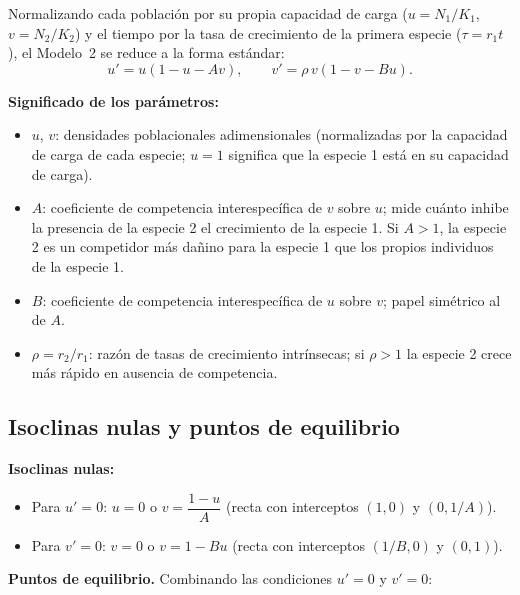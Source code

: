 \documentclass[11pt,letterpaper]{article}
\begin{document}
Normalizando cada población por su propia capacidad de carga ($u=N_1/K_1$,
$v=N_2/K_2$) y el tiempo por la tasa de crecimiento de la primera especie
($\tau=r_1 t$), el Modelo~2 se reduce a la forma estándar:
\[
\boxed{u' = u(1-u-Av),\qquad v' = \rho\, v(1-v-Bu).}
\]

\textbf{Significado de los parámetros:}
\begin{itemize}
    \item $u$, $v$: densidades poblacionales adimensionales (normalizadas por la
          capacidad de carga de cada especie; $u=1$ significa que la especie 1
          está en su capacidad de carga).
    \item $A$: coeficiente de competencia interespecífica de $v$ sobre $u$; mide
          cuánto inhibe la presencia de la especie 2 el crecimiento de la especie 1.
          Si $A>1$, la especie 2 es un competidor más dañino para la especie 1 que
          los propios individuos de la especie 1.
    \item $B$: coeficiente de competencia interespecífica de $u$ sobre $v$; papel
          simétrico al de $A$.
    \item $\rho=r_2/r_1$: razón de tasas de crecimiento intrínsecas; si $\rho>1$
          la especie 2 crece más rápido en ausencia de competencia.
\end{itemize}

\subsection{Isoclinas nulas y puntos de equilibrio}

\textbf{Isoclinas nulas:}
\begin{itemize}
    \item Para $u'=0$: \quad $u=0$ \quad o \quad $v=\dfrac{1-u}{A}$
          (recta con interceptos $(1,0)$ y $(0,1/A)$).
    \item Para $v'=0$: \quad $v=0$ \quad o \quad $v=1-Bu$
          (recta con interceptos $(1/B,0)$ y $(0,1)$).
\end{itemize}

\textbf{Puntos de equilibrio.} Combinando las condiciones $u'=0$ y $v'=0$:
\end{document}
